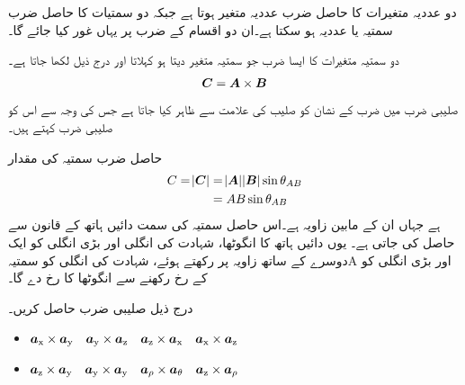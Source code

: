 دو عددیہ متغیرات کا حاصل ضرب عددیہ متغیر ہوتا ہے جبکہ دو سمتیات  کا حاصل ضرب سمتیہ  یا عددیہ ہو سکتا ہے۔ان دو اقسام کے ضرب پر یہاں غور کیا جائے گا۔

دو سمتیہ متغیرات  کا ایسا ضرب جو سمتیہ متغیر دیتا ہو   کہلاتا اور درج ذیل لکھا جاتا ہے۔
\begin{align}
{\ensuremath{{\boldsymbol{C}}}}={{\boldsymbol{A}}} \times {\ensuremath{{\boldsymbol{B}}}}
\end{align}
صلیبی ضرب میں ضرب کے نشان کو صلیب کی علامت سے ظاہر کیا جاتا ہے جس کی وجہ سے اس کو صلیبی ضرب کہتے ہیں۔

حاصل ضرب سمتیہ  کی مقدار
\begin{gather}
\begin{aligned}\label{مساوات_بنیادی_ضرب_صلیبی_تعریف}
C=\abs{{{\boldsymbol{C}}}} &= \abs {{{\boldsymbol{A}}}} \abs{{{\boldsymbol{B}}}} \sin \theta_{AB}\\
&=A B \sin \theta_{AB}
\end{aligned}
\end{gather}
ہے جہاں  ان کے مابین زاویہ ہے۔اس حاصل سمتیہ کی سمت دائیں ہاتھ  کے قانون سے  حاصل کی جاتی ہے۔ یوں دائیں ہاتھ کا انگوٹھا، شہادت کی انگلی اور  بڑی انگلی کو ایک دوسرے کے ساتھ  زاویہ پر رکھتے ہوئے، شہادت کی انگلی کو سمتیہ{A} اور بڑی انگلی کو   کے رخ رکھنے سے  انگوٹھا  کا رخ دے گا۔


درج ذیل صلیبی ضرب حاصل کریں۔
\begin{itemize}
\item
${\boldsymbol{a}}_{\textup{x}} \times {\boldsymbol{a}}_{\textup{y}} \quad {\boldsymbol{a}}_{\textup{y}} \times {\boldsymbol{a}}_{\textup{z}} \quad {\boldsymbol{a}}_{\textup{z}} \times {\boldsymbol{a}}_{\textup{x}} \quad {\boldsymbol{a}}_{\textup{x}} \times {\boldsymbol{a}}_{\textup{z}}$ 
\item
 ${\boldsymbol{a}}_{\textup{z}} \times {\boldsymbol{a}}_{\textup{y}} \quad {\boldsymbol{a}}_{\textup{y}} \times {\boldsymbol{a}}_{\textup{y}} \quad {\boldsymbol{a}}_{\rho} \times {\boldsymbol{a}}_{\theta} \quad {\boldsymbol{a}}_{\textup{z}} \times {\boldsymbol{a}}_{\rho}$
\end{itemize}


